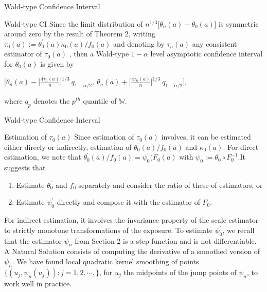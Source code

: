\documentclass{beamer}
\begin{document}


\begin{frame}{Wald-type Confidence Interval}

\begin{block}{Wald-type CI}
	Since the limit distribution of $n^{1/3} \Big[ \theta_n(a)-\theta_0(a) \Big]$ is symmetric around zero by the result of Theorem 2, writing $\tau_0(a):=\theta^{'}_0(a)\kappa_0(a)/f_0(a)$ and denoting by $\tau_n(a)$ any consistent estimator of $\tau_0(a)$ , then a Wald-type $1-\alpha$ level asymptotic confidence interval for $\theta_0(a)$ is given by
	\begin{center}
	$\Big[ \theta_n(a)-\Big[ \frac{4\tau_n(a)}{n} \Big]^{1/3} \ q_{1-\alpha /2}, \ \theta_n(a)+\Big[ \frac{4\tau_n(a)}{n} \Big]^{1/3} \ q_{1-\alpha /2}  \Bigg] $,
	\end{center}
	where $q_p$ denotes the $p^{th}$ quantile of $\mathbb{W}$.
\end{block}

\end{frame}


\begin{frame}{Wald-type Confidence Interval}

\begin{block}{Estimation of $\tau_0(a)$}
  Since estimation of $\tau_0(a)$ involves, it can be estimated either direcly or indirectly, estimation of $\theta^{'}_0(a)/f_0(a)$ and $\kappa_0(a)$.
  For direct estimation, we note that $\theta^{'}_0(a)/f_0(a)=\psi^{'}_0(F_0(a)$ with $\psi_0:=\theta_0 \circ F^{-1}_0$.It suggests that
  	\begin{enumerate}
  	\item Estimate $\theta^{'}_0$ and $f_0$ separately and consider the ratio of these of estimators; or
  	\item Estimate $\psi^{'}_0$ directly and compose it with the estimator of $F_0$.
  	\end{enumerate}

  For indirect estimation, it involves the invariance property of the scale estimator to strictly monotone transformations of the exposure. To estimate $\psi^{'}_0$, we recall that the estimator $\psi_n$ from Section 2 is a step function and is not differentiable. A Natural Solution consists of computing the derivative of a smoothed version of $\psi_n$. We have found local quadratic kernel smoothing of points $\lbrace (u_j,\psi_n(u_j)):j=1,2,\cdots,\rbrace$, for $u_j$ the midpoints of the jump points of $\psi_n$, to work well in practice.
\end{block}

\end{frame}
\end{document}
